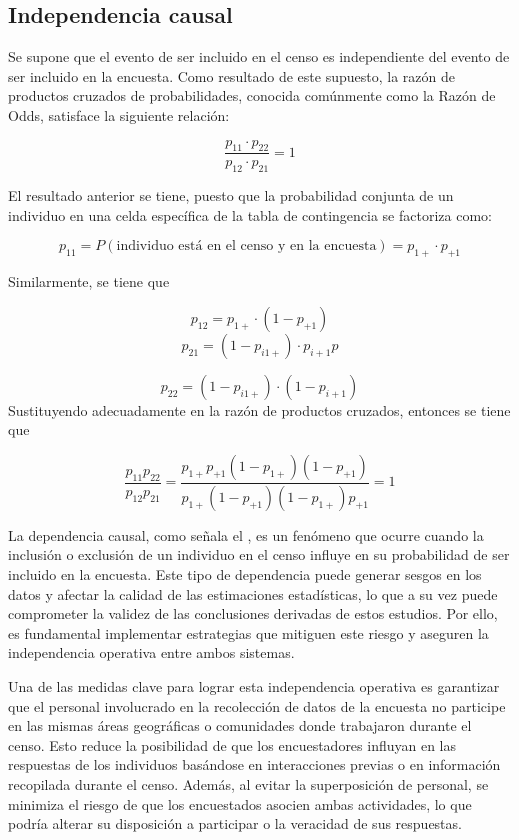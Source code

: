 \documentclass[
  12pt,
]{book}
\begin{document}
\hypertarget{independencia-causal}{%
\subsection{Independencia causal}\label{independencia-causal}}

Se supone que el evento de ser incluido en el censo es independiente del evento de ser incluido en la encuesta. Como resultado de este supuesto, la razón de productos cruzados de probabilidades, conocida comúnmente como la Razón de Odds, satisface la siguiente relación:

\[
\frac{p_{11} \cdot p_{22}}{p_{12} \cdot p_{21}} = 1
\]

El resultado anterior se tiene, puesto que la probabilidad conjunta de un individuo en una celda específica de la tabla de contingencia se factoriza como:

\[
p_{11} = P(\text{individuo está en el censo y en la encuesta}) = p_{1+} \cdot p_{+1}
\]

Similarmente, se tiene que

\[
p_{12} = p_{1+} \cdot (1 - p_{+1})
\]
\[
p_{21} = (1 - p_{i1+})\cdot p_{i+1}  p
\]

\[
p_{22} = (1 - p_{i1+}) \cdot (1 - p_{i+1})
\]
Sustituyendo adecuadamente en la razón de productos cruzados, entonces se tiene que

\[
\frac{p_{11} p_{22}}{p_{12} p_{21}} =
\frac{p_{1+} p_{+1} (1 - p_{1+}) (1 - p_{+1})}
{p_{1+} (1 - p_{+1}) (1 - p_{1+}) p_{+1}} = 1
\]

La dependencia causal, como señala el \citet{USCensusBureau_2022}, es un fenómeno que ocurre cuando la inclusión o exclusión de un individuo en el censo influye en su probabilidad de ser incluido en la encuesta. Este tipo de dependencia puede generar sesgos en los datos y afectar la calidad de las estimaciones estadísticas, lo que a su vez puede comprometer la validez de las conclusiones derivadas de estos estudios. Por ello, es fundamental implementar estrategias que mitiguen este riesgo y aseguren la independencia operativa entre ambos sistemas.

Una de las medidas clave para lograr esta independencia operativa es garantizar que el personal involucrado en la recolección de datos de la encuesta no participe en las mismas áreas geográficas o comunidades donde trabajaron durante el censo. Esto reduce la posibilidad de que los encuestadores influyan en las respuestas de los individuos basándose en interacciones previas o en información recopilada durante el censo. Además, al evitar la superposición de personal, se minimiza el riesgo de que los encuestados asocien ambas actividades, lo que podría alterar su disposición a participar o la veracidad de sus respuestas.
\end{document}
